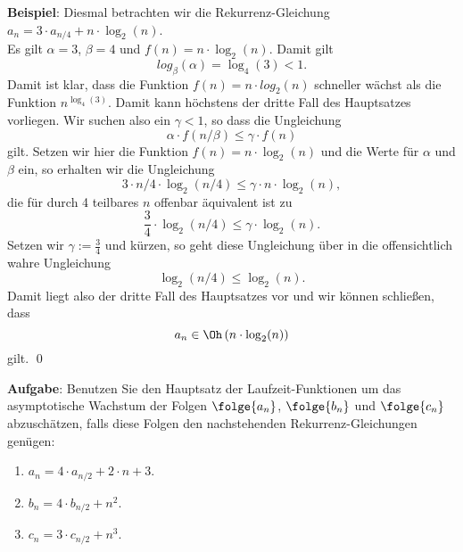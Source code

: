 \noindent
\textbf{Beispiel}:
Diesmal betrachten  wir die Rekurrenz-Gleichung 
\\[0.2cm]
\hspace*{1.3cm}
$a_n = 3 \cdot a_{n/4} + n \cdot \log_2(n)$.
\\[0.2cm]
Es gilt $\alpha = 3$, $\beta = 4$ und $f(n) = n \cdot \log_2(n)$.  Damit gilt
\[ log_\beta(\alpha) = \log_4(3) < 1. \]
Damit ist klar, dass die Funktion $f(n) = n \cdot log_2(n)$ schneller w\"achst als die
Funktion $n^{\log_4(3)}$.  Damit kann h\"ochstens der dritte Fall des Hauptsatzes vorliegen.
Wir suchen also ein $\gamma < 1$, so dass die Ungleichung
\[ \alpha \cdot f(n/\beta) \leq \gamma \cdot f(n) \]
gilt.  Setzen wir hier die Funktion $f(n) = n \cdot \log_2(n)$ und die Werte f\"ur $\alpha$
und $\beta$ ein, so erhalten wir die Ungleichung 
\[ 3 \cdot n/4 \cdot \log_2(n/4) \leq \gamma \cdot n \cdot \log_2(n), \]
die f\"ur durch 4 teilbares $n$ offenbar \"aquivalent ist zu
\[ \frac{3}{4} \cdot \log_2(n/4) \leq \gamma \cdot \log_2(n). \]
Setzen wir $\gamma := \frac{3}{4}$ und k\"urzen, so geht diese Ungleichung \"uber in die
offensichtlich wahre Ungleichung
\[ \log_2(n/4) \leq \log_2(n). \] 
Damit liegt also der dritte Fall des Hauptsatzes vor und wir k\"onnen schlie{\ss}en, dass
\[ a_n \in \Oh\left(n \cdot \log_2(n)\right) \]
gilt. \qed
\vspace*{0.3cm}

\noindent
\textbf{Aufgabe}:
Benutzen Sie den Hauptsatz der Laufzeit-Funktionen um das asymptotische Wachstum 
der Folgen $\folge{a_n}$, $\folge{b_n}$ und $\folge{c_n}$  abzusch\"atzen, falls diese
Folgen den nachstehenden Rekurrenz-Gleichungen gen\"ugen:
\begin{enumerate}
\item $a_n = 4 \cdot a_{n/2} + 2 \cdot n + 3$.
\item $b_n = 4 \cdot b_{n/2} + n^2$.
\item $c_n = 3 \cdot c_{n/2} + n^3$.
\end{enumerate}

